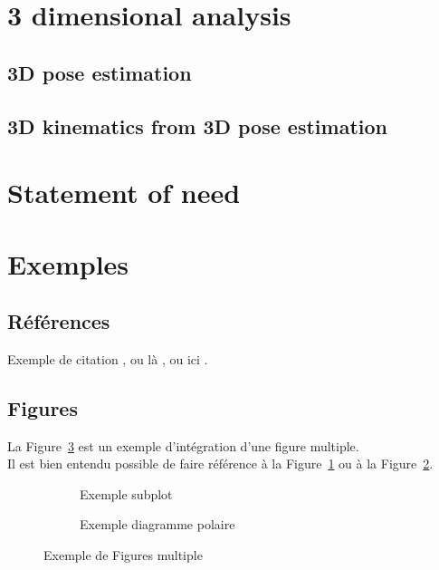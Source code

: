 \section{3 dimensional analysis}

\subsection{3D pose estimation}
\blindtext

\subsection{3D kinematics from 3D pose estimation}
\blindtext


\section{Statement of need}
\blindtext


\section{Exemples}
\subsection{Références}

Exemple de citation \cite{Mündermann2006evolution}, ou là \cite{Collomb2018b}, ou ici \cite{Collomb2018a,Collomb2017a,Collomb2018}. \\


\FloatBarrier
\subsection{Figures}

La Figure~\ref{figure_multiple} est un exemple d'intégration d'une figure multiple. \\
Il est bien entendu possible de faire référence à la Figure~\ref{figure_subplot} ou à la Figure~\ref{figure_polaire}.

\begin{figure}[hbtp]
	\centering
	\begin{subfigure}[b]{0.8\textwidth}
		\centering
		\def\svgwidth{\columnwidth}
		\fontsize{10pt}{10pt}\selectfont
		\caption{Exemple subplot} 
		\label{figure_subplot}
	\end{subfigure}
	\qquad
	\begin{subfigure}[b]{0.7\textwidth}
		\centering
		\def\svgwidth{\columnwidth}
		\fontsize{10pt}{10pt}\selectfont
		\caption{Exemple diagramme polaire} 
		\label{figure_polaire}
	\end{subfigure}
	\caption{Exemple de Figures multiple} 
	\label{figure_multiple}
\end{figure}



